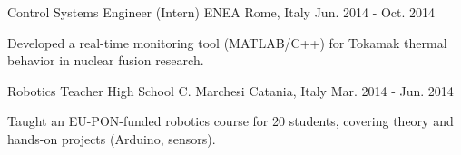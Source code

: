 \begin{cventries}
\cventry
  {Control Systems Engineer (Intern)} %
  {ENEA} %
  {Rome, Italy} %
  {Jun. 2014 - Oct. 2014} %
  {
    \begin{cvitems}
      \item {Developed a real-time monitoring tool (MATLAB/C++) for Tokamak thermal behavior in nuclear fusion research.}
    \end{cvitems}
  }

\cventry
  {Robotics Teacher} %
  {High School C. Marchesi} %
  {Catania, Italy} %
  {Mar. 2014 - Jun. 2014} %
  {
    \begin{cvitems}
      \item {Taught an EU-PON-funded robotics course for 20 students, covering theory and hands-on projects (Arduino, sensors).}
    \end{cvitems}
  }

\end{cventries}
